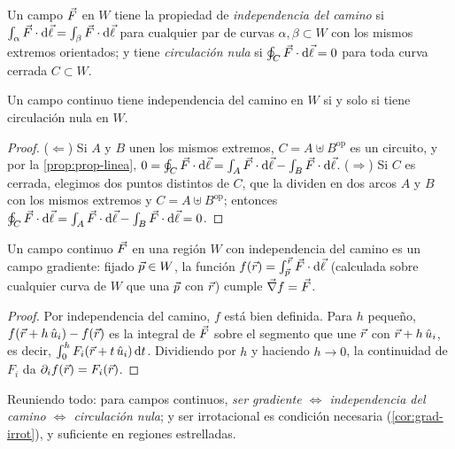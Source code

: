 \begin{definicion}\label{def:indep-camino}
Un campo $\vec{F}$ en $W$ tiene la propiedad de \emph{independencia del camino}
si $\int_\alpha\vec{F}\cdot\mathrm{d}\vec{\ell}=\int_\beta\vec{F}\cdot\mathrm{d}\vec{\ell}$ para cualquier par de
curvas $\alpha,\beta\subset W$ con los mismos extremos orientados; y tiene
\emph{circulación nula} si $\oint_C\vec{F}\cdot\mathrm{d}\vec{\ell}=0$ para toda curva cerrada
$C\subset W$.
\end{definicion}

\begin{proposicion}\label{prop:equiv-indep}
Un campo continuo tiene independencia del camino en $W$ si y solo si tiene
circulación nula en $W$.
\end{proposicion}
\begin{proof}
($\Leftarrow$) Si $A$ y $B$ unen los mismos extremos, $C=A\uplus B^{\mathrm{op}}$ es
un circuito, y por la \cref{prop:prop-linea},
$0=\oint_C\vec{F}\cdot\mathrm{d}\vec{\ell}=\int_A\vec{F}\cdot\mathrm{d}\vec{\ell}-\int_B\vec{F}\cdot\mathrm{d}\vec{\ell}$.
($\Rightarrow$) Si $C$ es cerrada, elegimos dos puntos distintos de $C$, que la
dividen en dos arcos $A$ y $B$ con los mismos extremos y $C=A\uplus B^{\mathrm{op}}$;
entonces $\oint_C\vec{F}\cdot\mathrm{d}\vec{\ell}=\int_A\vec{F}\cdot\mathrm{d}\vec{\ell}-\int_B\vec{F}\cdot\mathrm{d}\vec{\ell}=0$.
\end{proof}

\begin{proposicion}\label{prop:reciproco}
Un campo continuo $\vec{F}$ en una región $W$ con independencia del camino es un
campo gradiente: fijado $\vec{p}\in W$, la función
$f(\vec{r})=\int_{\vec{p}}^{\vec{r}}\vec{F}\cdot\mathrm{d}\vec{\ell}$ (calculada sobre cualquier
curva de $W$ que una $\vec{p}$ con $\vec{r}$) cumple $\vec{\nabla} f=\vec{F}$.
\end{proposicion}
\begin{proof}
Por independencia del camino, $f$ está bien definida. Para $h$ pequeño,
$f(\vec{r}+h\,\hat{u}_{i})-f(\vec{r})$ es la integral de $\vec{F}$ sobre el segmento que
une $\vec{r}$ con $\vec{r}+h\,\hat{u}_{i}$, es decir,
$\int_0^hF_i(\vec{r}+t\,\hat{u}_{i})\,\mathrm{d} t$. Dividiendo por $h$ y haciendo
$h\to0$, la continuidad de $F_i$ da $\partial_if(\vec{r})=F_i(\vec{r})$.
\end{proof}

Reuniendo todo: para campos continuos, \emph{ser gradiente $\Leftrightarrow$
independencia del camino $\Leftrightarrow$ circulación nula}; y ser irrotacional es
condición necesaria (\cref{cor:grad-irrot}), y suficiente en regiones
estrelladas.

